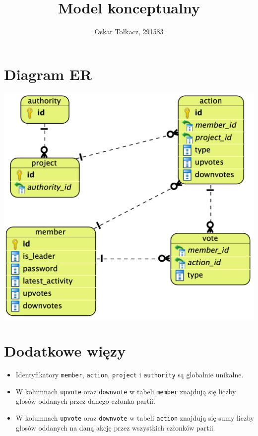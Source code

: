 \documentclass[polish,11pt,a4paper]{article}
\title{\huge{Model konceptualny}}
\author{\large{Oskar Tołkacz, 291583}}
\begin{document}
\clearpage
\maketitle
\thispagestyle{empty}

\newpage
\tableofcontents

\newpage

\section{Diagram ER}
\begin{center}
	\includegraphics[scale=0.3]{ERD.png}
\end{center}

\section{Dodatkowe więzy}
\begin{itemize}
	\item Identyfikatory \texttt{member}, \texttt{action}, \texttt{project} i \texttt{authority} są globalnie unikalne.
    \item W kolumnach \texttt{upvote} oraz \texttt{downvote} w tabeli \texttt{member} znajdują się liczby głosów oddanych przez danego członka partii.
    \item W kolumnach \texttt{upvote} oraz \texttt{downvote} w tabeli \texttt{action} znajdują się sumy liczby głosów oddanych na daną akcję przez wszystkich członków partii.
\end{itemize}
\end{document}

